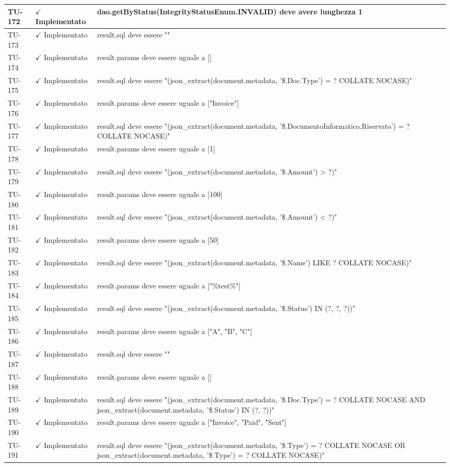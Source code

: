 ﻿\documentclass[a4paper,12pt]{article}
\newcommand{\ok}{\textcolor{green!60!black}{$\checkmark$ Implementato}}
\begin{document}
\begin{longtable}{|p{2cm}|p{3.5cm}|p{9.5cm}|}
\hline
TU-172 & \ok & dao.getByStatus(IntegrityStatusEnum.INVALID) deve avere lunghezza 1 \\
\hline
TU-173 & \ok & result.sql deve essere "" \\
\hline
TU-174 & \ok & result.params deve essere uguale a [] \\
\hline
TU-175 & \ok & result.sql deve essere "(json\_extract(document.metadata, '\$.Doc.Type') = ? COLLATE NOCASE)" \\
\hline
TU-176 & \ok & result.params deve essere uguale a ["Invoice"] \\
\hline
TU-177 & \ok & result.sql deve essere "(json\_extract(document.metadata, '\$.DocumentoInformatico.Riservato') = ? COLLATE NOCASE)" \\
\hline
TU-178 & \ok & result.params deve essere uguale a [1] \\
\hline
TU-179 & \ok & result.sql deve essere "(json\_extract(document.metadata, '\$.Amount') > ?)" \\
\hline
TU-180 & \ok & result.params deve essere uguale a [100] \\
\hline
TU-181 & \ok & result.sql deve essere "(json\_extract(document.metadata, '\$.Amount') < ?)" \\
\hline
TU-182 & \ok & result.params deve essere uguale a [50] \\
\hline
TU-183 & \ok & result.sql deve essere "(json\_extract(document.metadata, '\$.Name') LIKE ? COLLATE NOCASE)" \\
\hline
TU-184 & \ok & result.params deve essere uguale a ["\%test\%"] \\
\hline
TU-185 & \ok & result.sql deve essere "(json\_extract(document.metadata, '\$.Status') IN (?, ?, ?))" \\
\hline
TU-186 & \ok & result.params deve essere uguale a ["A", "B", "C"] \\
\hline
TU-187 & \ok & result.sql deve essere "" \\
\hline
TU-188 & \ok & result.params deve essere uguale a [] \\
\hline
TU-189 & \ok & result.sql deve essere "(json\_extract(document.metadata, '\$.Doc.Type') = ? COLLATE NOCASE AND json\_extract(document.metadata, '\$.Status') IN (?, ?))" \\
\hline
TU-190 & \ok & result.params deve essere uguale a ["Invoice", "Paid", "Sent"] \\
\hline
TU-191 & \ok & result.sql deve essere "(json\_extract(document.metadata, '\$.Type') = ? COLLATE NOCASE OR json\_extract(document.metadata, '\$.Type') = ? COLLATE NOCASE)" \\

\end{longtable}
\end{document}
